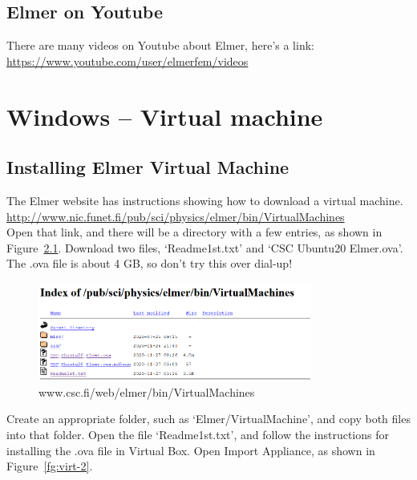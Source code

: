 \section{Elmer on Youtube}

There are many videos on Youtube about Elmer, here's a link:\\

\url{https://www.youtube.com/user/elmerfem/videos}

\chapter{Windows -- Virtual machine}

\section{Installing Elmer Virtual Machine}

The Elmer website has instructions showing how to download a virtual machine.\\

 \url{http://www.nic.funet.fi/pub/sci/physics/elmer/bin/VirtualMachines}\\

Open that link, and there will be a directory with a few entries, as shown in Figure~\ref{fg:virt-1}.  Download two files, `Readme1st.txt' and  `CSC Ubuntu20 Elmer.ova'.  The .ova file is about 4 GB, so don't try this over dial-up!\\

\begin{figure}[H]
\begin{center}
\includegraphics[width=0.8\textwidth]{virt-1}
\caption{www.csc.fi/web/elmer/bin/VirtualMachines}\label{fg:virt-1}
\end{center}
\end{figure}

Create an appropriate folder, such as `Elmer/VirtualMachine', and copy both files into that folder.  Open the file `Readme1st.txt', and follow the instructions for installing the .ova file in Virtual Box.  Open Import Appliance, as shown in Figure~\ref{fg:virt-2}.

